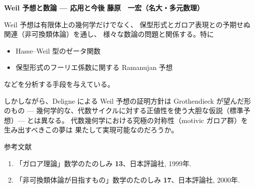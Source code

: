 \documentclass[uplatex,dvipdfmx]{jlreq}
\begin{document}
\newpage

\noindent
{\large\bfseries Weil 予想と数論 --- 応用と今後}
\hfill
{\large\bfseries 藤原　一宏（名大・多元数理）}

\bigskip

Weil 予想は有限体上の幾何学だけでなく、
保型形式とガロア表現との予期せぬ関連（非可換類体論）を通し、
様々な数論の問題と関係する。特に
\begin{itemize}
  \item Hasse--Weil 型のゼータ関数
  \item 保型形式のフーリエ係数に関する Ramanujan 予想
\end{itemize}
などを分析する手段を与えている。

しかしながら、Deligne による Weil 予想の証明方針は Grothendieck が望んだ形のもの
--- 幾何学的な、代数サイクルに対する正値性を使う大胆な仮説（標準予想）---
とは異なる。
代数幾何学における究極の対称性（motivic ガロア群）を生み出すべきこの夢は
果たして実現可能なのだろうか。

\vspace{6pt}

\begin{center}
  \textsc{参考文献}
\end{center}
\begin{enumerate}
  \item[{[1]}] 「ガロア理論」数学のたのしみ \textbf{13}、日本評論社, 1999年.
  \item[{[2]}] 「非可換類体論が目指すもの」数学のたのしみ \textbf{17}、日本評論社, 2000年.
\end{enumerate}
\end{document}
